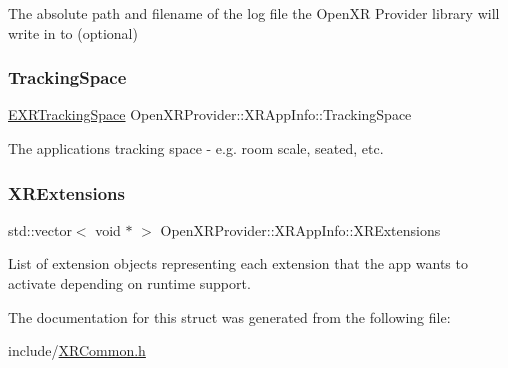 The absolute path and filename of the log file the Open\+XR Provider library will write in to (optional) 

\mbox{\label{struct_open_x_r_provider_1_1_x_r_app_info_adc373e7d26617bc10d2d46d6152a6a17}} 
\subsubsection{\texorpdfstring{TrackingSpace}{TrackingSpace}}
{\footnotesize\ttfamily \mbox{\hyperlink{namespace_open_x_r_provider_a005dd91723b05b123b8fccbc41798b05}{E\+X\+R\+Tracking\+Space}} Open\+X\+R\+Provider\+::\+X\+R\+App\+Info\+::\+Tracking\+Space}



The application\textquotesingle{}s tracking space -\/ e.\+g. room scale, seated, etc. 

\mbox{\label{struct_open_x_r_provider_1_1_x_r_app_info_a8b51fa00d11c4b3711440bf4b20b57fe}} 
\subsubsection{\texorpdfstring{XRExtensions}{XRExtensions}}
{\footnotesize\ttfamily std\+::vector$<$ void $\ast$ $>$ Open\+X\+R\+Provider\+::\+X\+R\+App\+Info\+::\+X\+R\+Extensions}



List of extension objects representing each extension that the app wants to activate depending on runtime support. 



The documentation for this struct was generated from the following file\+:\begin{DoxyCompactItemize}
\item 
include/\mbox{\hyperlink{_x_r_common_8h}{X\+R\+Common.\+h}}\end{DoxyCompactItemize}
